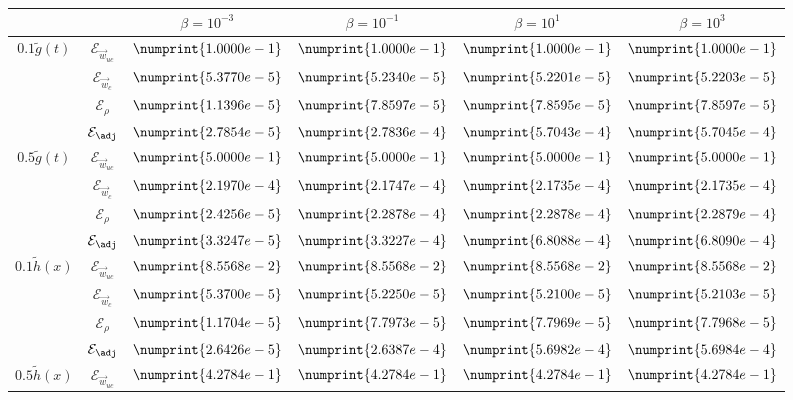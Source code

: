 \begin{table}
\begin{tabular}{ | c | c || c | c | c | c ||}
\hline
  \multicolumn{2}{|c||}{} & $\beta = 10^{-3}$ & $\beta = 10^{-1}$ & $\beta = 10^{1}$ & $\beta = 10^{3}$  \\
\hline
\hline
\multirow{4}{*}{$0.1 \tilde g(t)$} & $\mathcal{E}_{\vec{w}_{uc}}$ & $\numprint{1.0000e-1}$ & $\numprint{1.0000e-1}$ & $\numprint{1.0000e-1}$ & $\numprint{1.0000e-1}$ \\
 & $\mathcal{E}_{\vec{w}_c}$ & $\numprint{5.3770e-5}$ & $\numprint{5.2340e-5}$ & $\numprint{5.2201e-5}$ & $\numprint{5.2203e-5}$ \\
 & $\mathcal{E}_{\rho}$ & $\numprint{1.1396e-5}$ & $\numprint{7.8597e-5}$ & $\numprint{7.8595e-5}$ & $\numprint{7.8597e-5}$ \\
 & $\mathcal{E}_{\adj}$ & $\numprint{2.7854e-5}$ & $\numprint{2.7836e-4}$ & $\numprint{5.7043e-4}$ & $\numprint{5.7045e-4}$ \\
\hline
\multirow{4}{*}{$0.5 \tilde g(t)$} & $\mathcal{E}_{\vec{w}_{uc}}$ & $\numprint{5.0000e-1}$ & $\numprint{5.0000e-1}$ & $\numprint{5.0000e-1}$ & $\numprint{5.0000e-1}$ \\
 & $\mathcal{E}_{\vec{w}_c}$ & $\numprint{2.1970e-4}$ & $\numprint{2.1747e-4}$ & $\numprint{2.1735e-4}$ & $\numprint{2.1735e-4}$ \\
 & $\mathcal{E}_{\rho}$ & $\numprint{2.4256e-5}$ & $\numprint{2.2878e-4}$ & $\numprint{2.2878e-4}$ & $\numprint{2.2879e-4}$ \\
 & $\mathcal{E}_{\adj}$ & $\numprint{3.3247e-5}$ & $\numprint{3.3227e-4}$ & $\numprint{6.8088e-4}$ & $\numprint{6.8090e-4}$ \\
\hline
\multirow{4}{*}{$0.1 \tilde h(x)$} & $\mathcal{E}_{\vec{w}_{uc}}$ & $\numprint{8.5568e-2}$ & $\numprint{8.5568e-2}$ & $\numprint{8.5568e-2}$ & $\numprint{8.5568e-2}$ \\
 & $\mathcal{E}_{\vec{w}_c}$ & $\numprint{5.3700e-5}$ & $\numprint{5.2250e-5}$ & $\numprint{5.2100e-5}$ & $\numprint{5.2103e-5}$ \\
 & $\mathcal{E}_{\rho}$ & $\numprint{1.1704e-5}$ & $\numprint{7.7973e-5}$ & $\numprint{7.7969e-5}$ & $\numprint{7.7968e-5}$ \\
 & $\mathcal{E}_{\adj}$ & $\numprint{2.6426e-5}$ & $\numprint{2.6387e-4}$ & $\numprint{5.6982e-4}$ & $\numprint{5.6984e-4}$ \\
\hline
\multirow{4}{*}{$0.5 \tilde h(x)$} & $\mathcal{E}_{\vec{w}_{uc}}$ & $\numprint{4.2784e-1}$ & $\numprint{4.2784e-1}$ & $\numprint{4.2784e-1}$ & $\numprint{4.2784e-1}$ \\

\end{tabular}
\end{table}
